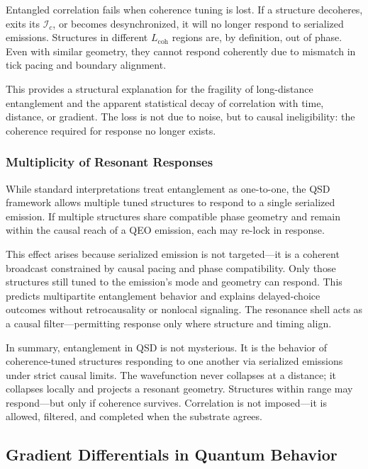 \documentclass[preprints,article,submit,pdftex,moreauthors]{Definitions/mdpi}
\begin{document}
Entangled correlation fails when coherence tuning is lost. If a structure decoheres, exits its \( \mathcal{I}_c \), or becomes desynchronized, it will no longer respond to serialized emissions. Structures in different \( L_{\text{coh}} \) regions are, by definition, out of phase. Even with similar geometry, they cannot respond coherently due to mismatch in tick pacing and boundary alignment.

This provides a structural explanation for the fragility of long-distance entanglement and the apparent statistical decay of correlation with time, distance, or gradient. The loss is not due to noise, but to causal ineligibility: the coherence required for response no longer exists.

\subsubsection*{Multiplicity of Resonant Responses}

While standard interpretations treat entanglement as one-to-one, the QSD framework allows multiple tuned structures to respond to a single serialized emission. If multiple structures share compatible phase geometry and remain within the causal reach of a QEO emission, each may re-lock in response.

This effect arises because serialized emission is not targeted—it is a coherent broadcast constrained by causal pacing and phase compatibility. Only those structures still tuned to the emission’s mode and geometry can respond. This predicts multipartite entanglement behavior and explains delayed-choice outcomes without retrocausality or nonlocal signaling. The resonance shell acts as a causal filter—permitting response only where structure and timing align.

\smallskip

In summary, entanglement in QSD is not mysterious. It is the behavior of coherence-tuned structures responding to one another via serialized emissions under strict causal limits. The wavefunction never collapses at a distance; it collapses locally and projects a resonant geometry. Structures within range may respond—but only if coherence survives. Correlation is not imposed—it is allowed, filtered, and completed when the substrate agrees.


\subsection{Gradient Differentials in Quantum Behavior}
\label{subsec:gradienteffects}
\end{document}
